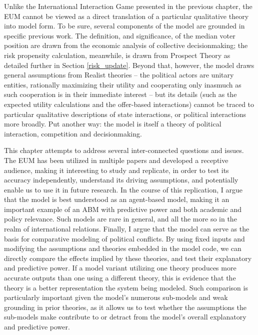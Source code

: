 Unlike the International Interaction Game presented in the previous chapter, the EUM cannot be viewed as a direct translation of a particular qualitative theory into model form. To be sure, several components of the model are grounded in specific previous work. The definition, and significance, of the median voter position are drawn from the \citet{black_1948} economic analysis of collective decisionmaking; the risk propensity calculation, meanwhile, is drawn from Prospect Theory \citep{kahneman_1984} as detailed further in Section \ref{risk_update}. Beyond that, however, the model draws general assumptions from Realist theories -- the political actors are unitary entities, rationally maximizing their utility and cooperating only inasmuch as such cooperation is in their immediate interest -- but its details (such as the expected utility calculations and the offer-based interactions) cannot be traced to particular qualitative descriptions of state interactions, or political interactions more broadly. Put another way: the model is itself a theory of political interaction, competition and decisionmaking.

This chapter attempts to address several inter-connected questions and issues. The EUM has been utilized in multiple papers and developed a receptive audience, making it interesting to study and replicate, in order to test its accuracy independently, understand its driving assumptions, and potentially enable us to use it in future research. In the course of this replication, I argue that the model is best understood as an agent-based model, making it an important example of an ABM with predictive power and both academic and policy relevance. Such models are rare in general, and all the more so in the realm of international relations. Finally, I argue that the model can serve as the basis for comparative modeling of political conflicts. By using fixed inputs and modifying the assumptions and theories embedded in the model code, we can directly compare the effects implied by these theories, and test their explanatory and predictive power. If a model variant utilizing one theory produces more accurate outputs than one using a different theory, this is evidence that the theory is a better representation the system being modeled. Such comparison is particularly important given the model's numerous sub-models and weak grounding in prior theories, as it allows us to test whether the assumptions the sub-models make contribute to or detract from the model's overall explanatory and predictive power.

